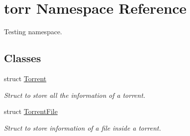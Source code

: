 \hypertarget{namespacetorr}{}\section{torr Namespace Reference}
\label{namespacetorr}


Testing namespace.  


\subsection*{Classes}
\begin{DoxyCompactItemize}
\item 
struct \hyperlink{structtorr_1_1Torrent}{Torrent}
\begin{DoxyCompactList}\small\item\em Struct to store all the information of a torrent. \end{DoxyCompactList}\item 
struct \hyperlink{structtorr_1_1TorrentFile}{Torrent\+File}
\begin{DoxyCompactList}\small\item\em Struct to store information of a file inside a torrent. \end{DoxyCompactList}\end{DoxyCompactItemize}
